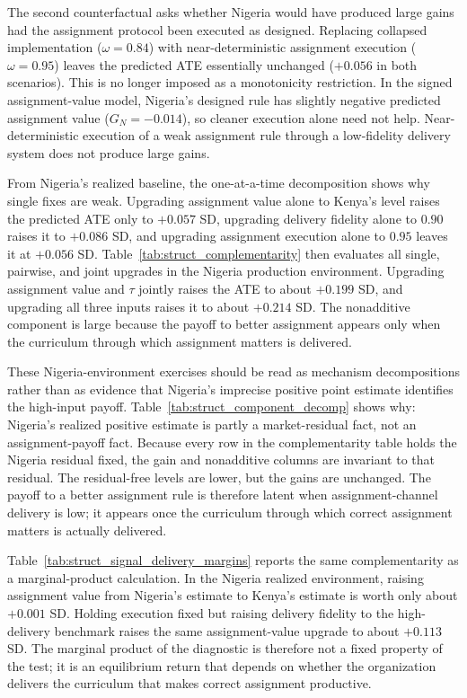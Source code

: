 \documentclass[11pt]{article}
\begin{document}
The second counterfactual asks whether Nigeria would have produced large gains had the assignment protocol been executed as designed. Replacing collapsed implementation ($\omega = 0.84$) with near-deterministic assignment execution ($\omega = 0.95$) leaves the predicted ATE essentially unchanged ($+0.056$ in both scenarios). This is no longer imposed as a monotonicity restriction. In the signed assignment-value model, Nigeria's designed rule has slightly negative predicted assignment value ($G_N=-0.014$), so cleaner execution alone need not help. Near-deterministic execution of a weak assignment rule through a low-fidelity delivery system does not produce large gains.

From Nigeria's realized baseline, the one-at-a-time decomposition shows why single fixes are weak. Upgrading assignment value alone to Kenya's level raises the predicted ATE only to $+0.057$ SD, upgrading delivery fidelity alone to $0.90$ raises it to $+0.086$ SD, and upgrading assignment execution alone to $0.95$ leaves it at $+0.056$ SD. Table~\ref{tab:struct_complementarity} then evaluates all single, pairwise, and joint upgrades in the Nigeria production environment. Upgrading assignment value and $\tau$ jointly raises the ATE to about $+0.199$ SD, and upgrading all three inputs raises it to about $+0.214$ SD. The nonadditive component is large because the payoff to better assignment appears only when the curriculum through which assignment matters is delivered.

These Nigeria-environment exercises should be read as mechanism decompositions rather than as evidence that Nigeria's imprecise positive point estimate identifies the high-input payoff. Table~\ref{tab:struct_component_decomp} shows why: Nigeria's realized positive estimate is partly a market-residual fact, not an assignment-payoff fact. Because every row in the complementarity table holds the Nigeria residual fixed, the gain and nonadditive columns are invariant to that residual. The residual-free levels are lower, but the gains are unchanged. The payoff to a better assignment rule is therefore latent when assignment-channel delivery is low; it appears once the curriculum through which correct assignment matters is actually delivered.



Table~\ref{tab:struct_signal_delivery_margins} reports the same complementarity as a marginal-product calculation. In the Nigeria realized environment, raising assignment value from Nigeria's estimate to Kenya's estimate is worth only about $+0.001$ SD. Holding execution fixed but raising delivery fidelity to the high-delivery benchmark raises the same assignment-value upgrade to about $+0.113$ SD. The marginal product of the diagnostic is therefore not a fixed property of the test; it is an equilibrium return that depends on whether the organization delivers the curriculum that makes correct assignment productive.
\end{document}
